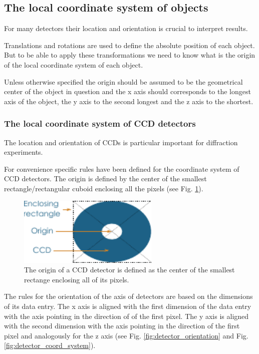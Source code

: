 \documentclass[usletter,11pt]{article}
\begin{document}
\subsection{The local coordinate system of objects}
\label{originOfObjects}

For many detectors their location and orientation is crucial to
interpret results. 

Translations and rotations are used to define
the absolute position of each object. But to be able to apply these
transformations we need to know what is the origin of the local
coordinate system of each object.

Unless otherwise specified the origin should be assumed to be the
geometrical center of the object in question and the x axis should
corresponds to the longest axis of the object, the y axis to the
second longest and the z axis to the shortest.

\subsubsection{The local coordinate system of CCD detectors}

The location and orientation of CCDs is particular important for
diffraction experiments.

For convenience specific rules have been defined for the coordinate
system of CCD detectors.
The origin is defined by the center of the smallest
rectangle/rectangular cuboid enclosing all the pixels (see
Fig. \ref{fig:object_origin}). 

\begin{figure}[h!]
\centering
\includegraphics[width=0.6\textwidth]{object_origin.pdf}
\caption{The origin of a CCD detector is defined as the center of the
smallest rectange enclosing all of its pixels.}
\label{fig:object_origin}
\end{figure}
 
The rules for the orientation of the axis of detectors are based on
the dimensions of its data entry. The x axis is aligned with the first
dimension of the data entry with the axis pointing in the direction of
of the first pixel. The y axis is aligned with the second dimension
with the axis pointing in the direction of the first pixel and
analogously for the z axis (see Fig. \ref{fig:detector_orientation}
and Fig. \ref{fig:detector_coord_system}).
\end{document}
